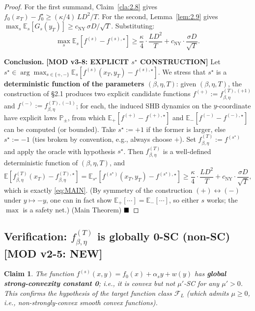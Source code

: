 \documentclass[11pt,a4paper]{article}
\theoremstyle{plain}
\newtheorem{claim}[theorem]{Claim}
\theoremstyle{definition}
\theoremstyle{remark}
\newcommand{\E}{\mathbb{E}}
\newcommand{\Prb}{\mathbb{P}}
\begin{document}
\begin{proof}
For the first summand, Claim~\ref{cla:2.8} gives $f_0(x_T) - f_0^\star \geq (\kappa/4)\,LD^2/T$. For the second, Lemma~\ref{lem:2.9} gives $\max_s \E_s[G_s(y_T)] \geq c_\mathrm{NY}\,\sigma D/\sqrt T$. Substituting:
\[
\max_s \E_s[f^{(s)} - f^{(s),\star}] \geq \frac{\kappa}{4}\cdot\frac{LD^2}{T} + c_\mathrm{NY}\cdot \frac{\sigma D}{\sqrt T}.
\]

\textbf{Conclusion.} \textbf{[MOD v3-8: EXPLICIT $s^\star$ CONSTRUCTION]} Let $s^\star \in \arg\max_{s \in \{+,-\}} \E_s[f^{(s)}(x_T, y_T) - f^{(s),\star}]$. We stress that $s^\star$ is a \textbf{deterministic function of the parameters $(\beta, \eta, T)$}: given $(\beta, \eta, T)$, the construction of \S2.1 produces two explicit candidate functions $f^{(+)} := f_{\beta,\eta}^{(T),(+1)}$ and $f^{(-)} := f_{\beta,\eta}^{(T),(-1)}$; for each, the induced SHB dynamics on the $y$-coordinate have explicit laws $\Prb_\pm$, from which $\E_+[f^{(+)} - f^{(+),\star}]$ and $\E_-[f^{(-)} - f^{(-),\star}]$ can be computed (or bounded). Take $s^\star := +1$ if the former is larger, else $s^\star := -1$ (ties broken by convention, e.g., always choose $+$). Set $f_{\beta,\eta}^{(T)} := f^{(s^\star)}$ and apply the oracle with hypothesis $s^\star$. Then $f_{\beta,\eta}^{(T)}$ is a well-defined deterministic function of $(\beta,\eta,T)$, and
\[
\E[f_{\beta,\eta}^{(T)}(x_T) - f_{\beta,\eta}^{(T),\star}] = \E_{s^\star}[f^{(s^\star)}(x_T, y_T) - f^{(s^\star),\star}] \geq \frac{\kappa}{4}\cdot\frac{LD^2}{T} + c_\mathrm{NY}\cdot\frac{\sigma D}{\sqrt T},
\]
which is exactly \eqref{eq:MAIN}. (By symmetry of the construction $(+) \leftrightarrow (-)$ under $y \mapsto -y$, one can in fact show $\E_+[\cdots] = \E_-[\cdots]$, so either $s$ works; the $\max$ is a safety net.) (Main Theorem) $\hfill\blacksquare$
\end{proof}

\subsection{Verification: $f_{\beta,\eta}^{(T)}$ is globally 0-SC (non-SC) \textbf{[MOD v2-5: NEW]}}

\begin{claim}
\label{cla:2.12}
The function $f^{(s)}(x, y) = f_0(x) + \alpha_s y + w(y)$ has \textbf{global strong-convexity constant 0}; i.e., it is convex but not $\mu'$-SC for any $\mu' > 0$. This confirms the hypothesis of the target function class $\mathcal{F}_L$ (which admits $\mu \geq 0$, i.e., non-strongly-convex smooth convex functions).
\end{claim}
\end{document}
